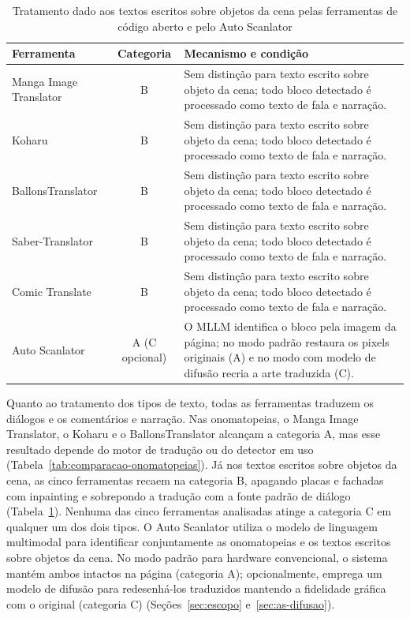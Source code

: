 \documentclass[
    12pt,
    openright,
    oneside,
    a4paper,
    chapter=TITLE,
    section=TITLE,
    english,
    brazilian,
    brazil
]{abntex2}
\renewcommand{\footnotesize}{\fontsize{10pt}{12pt}\selectfont}
\begin{document}
\begin{table}[htb]
    \caption{Tratamento dado aos textos escritos sobre objetos da cena pelas ferramentas de código aberto e pelo Auto Scanlator}
    \label{tab:comparacao-texto-cena}
    \centering
    \footnotesize
    \setlength{\tabcolsep}{4pt}
    \renewcommand{\arraystretch}{1.25}
    \begin{tabular}{|p{3.5cm}|c|p{10.0cm}|}
        \hline
        \textbf{Ferramenta} & \textbf{Categoria} & \textbf{Mecanismo e condição} \\
        \hline
        \hline
        Manga Image Translator & B & Sem distinção para texto escrito sobre objeto da cena; todo bloco detectado é processado como texto de fala e narração. \\
        \hline
        Koharu & B & Sem distinção para texto escrito sobre objeto da cena; todo bloco detectado é processado como texto de fala e narração. \\
        \hline
        BallonsTranslator & B & Sem distinção para texto escrito sobre objeto da cena; todo bloco detectado é processado como texto de fala e narração. \\
        \hline
        Saber-Translator & B & Sem distinção para texto escrito sobre objeto da cena; todo bloco detectado é processado como texto de fala e narração. \\
        \hline
        Comic Translate & B & Sem distinção para texto escrito sobre objeto da cena; todo bloco detectado é processado como texto de fala e narração. \\
        \hline
        Auto Scanlator & A (C opcional) & O MLLM identifica o bloco pela imagem da página; no modo padrão restaura os pixels originais (A) e no modo com modelo de difusão recria a arte traduzida (C). \\
        \hline
    \end{tabular}
\end{table}

Quanto ao tratamento dos tipos de texto, todas as ferramentas traduzem os diálogos e os comentários e narração. Nas onomatopeias, o Manga Image Translator, o Koharu e o BallonsTranslator alcançam a categoria A, mas esse resultado depende do motor de tradução ou do detector em uso (Tabela~\ref{tab:comparacao-onomatopeias}). Já nos textos escritos sobre objetos da cena, as cinco ferramentas recaem na categoria B, apagando placas e fachadas com inpainting e sobrepondo a tradução com a fonte padrão de diálogo (Tabela~\ref{tab:comparacao-texto-cena}). Nenhuma das cinco ferramentas analisadas atinge a categoria C em qualquer um dos dois tipos. O Auto Scanlator utiliza o modelo de linguagem multimodal para identificar conjuntamente as onomatopeias e os textos escritos sobre objetos da cena. No modo padrão para hardware convencional, o sistema mantém ambos intactos na página (categoria A); opcionalmente, emprega um modelo de difusão para redesenhá-los traduzidos mantendo a fidelidade gráfica com o original (categoria C) (Seções~\ref{sec:escopo} e~\ref{sec:as-difusao}).
\end{document}
